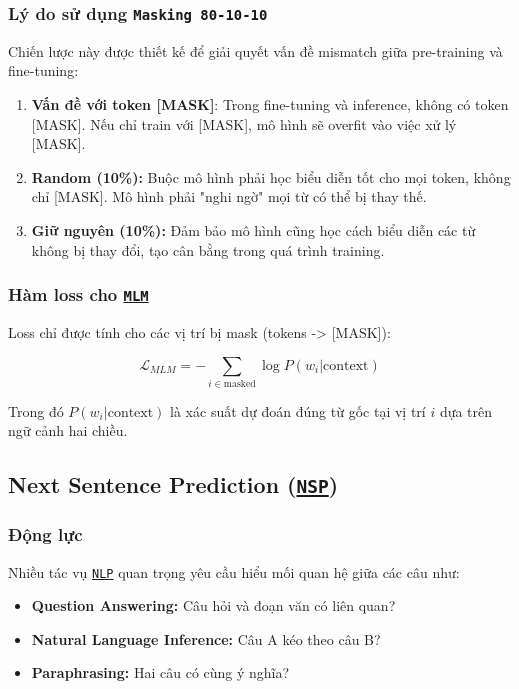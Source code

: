 \subsubsection{Lý do sử dụng \texttt{Masking 80-10-10}}
Chiến lược này được thiết kế để giải quyết vấn đề mismatch giữa pre-training và fine-tuning:

\begin{enumerate}
    \item \textbf{Vấn đề với token [MASK]}: Trong fine-tuning và inference, không có token [MASK]. Nếu chỉ train với [MASK], mô hình sẽ overfit vào việc xử lý [MASK].
    
    \item \textbf{Random (10\%):} Buộc mô hình phải học biểu diễn tốt cho mọi token, không chỉ [MASK]. Mô hình phải "nghi ngờ" mọi từ có thể bị thay thế.
    
    \item \textbf{Giữ nguyên (10\%):} Đảm bảo mô hình cũng học cách biểu diễn các từ không bị thay đổi, tạo cân bằng trong quá trình training.
\end{enumerate}

\subsubsection{Hàm loss cho \hyperref[acro:mlm]{\texttt{MLM}}}
Loss chỉ được tính cho các vị trí bị mask (tokens -> [MASK]):

\begin{equation}
\mathcal{L}_{MLM} = -\sum_{i \in \text{masked}} \log P(w_i | \text{context})
\label{eq:mlm_loss}
\end{equation}

Trong đó $P(w_i | \text{context})$ là xác suất dự đoán đúng từ gốc tại vị trí $i$ dựa trên ngữ cảnh hai chiều.

\subsection{Next Sentence Prediction (\hyperref[acro:nsp]{\texttt{NSP}})}
\label{ssec:nsp}

\subsubsection{Động lực}
Nhiều tác vụ \hyperref[acro:nlp]{\texttt{NLP}} quan trọng yêu cầu hiểu mối quan hệ giữa các câu như:
\begin{itemize}
    \item \textbf{Question Answering:} Câu hỏi và đoạn văn có liên quan?
    \item \textbf{Natural Language Inference:} Câu A kéo theo câu B?
    \item \textbf{Paraphrasing:} Hai câu có cùng ý nghĩa?
\end{itemize}

